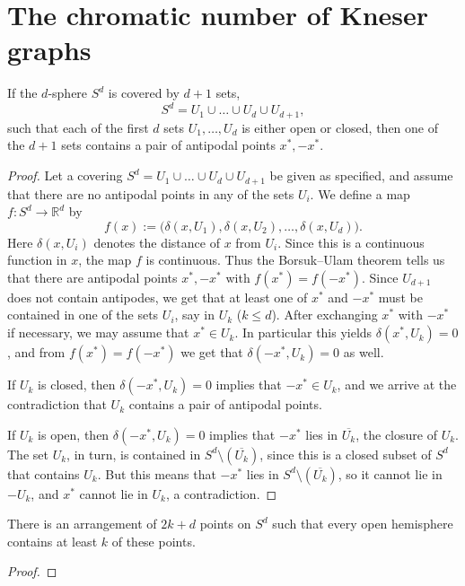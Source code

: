 \chapter{The chromatic number of Kneser graphs}

\begin{theorem}
  \label{lyusternik_shnirelman}
  If the $d$-sphere $S^d$ is covered by $d + 1$ sets,
\[
S^d = U_1 \cup \dots \cup U_d \cup U_{d+1},
\]
such that each of the first $d$ sets $U_1, \dots, U_d$ is either open or closed, then one of the $d + 1$ sets contains a pair of antipodal points $x^*, -x^*$.
\end{theorem}
\begin{proof}
Let a covering $S^d = U_1 \cup \dots \cup U_d \cup U_{d+1}$ be given as specified, and assume that there are no antipodal points in any of the sets $U_i$. We define a map $f : S^d \to \mathbb{R}^d$ by
\[
f(x) := \big(\delta(x, U_1), \delta(x, U_2), \dots, \delta(x, U_d)\big).
\]
Here $\delta(x, U_i)$ denotes the distance of $x$ from $U_i$. Since this is a continuous
 function in $x$, the map $f$ is continuous. Thus the Borsuk–Ulam theorem tells us that there are
  antipodal points $x^*, -x^*$ with $f(x^*) = f(-x^*)$. Since $U_{d+1}$ does not contain antipodes,
  we get that at least one of $x^*$ and $-x^*$ must be
contained in one of the sets $U_i$, say in $U_k$ ($k \leq d$).
 After exchanging $x^*$ with $-x^*$ if necessary, we may assume that $x^* \in U_k$.
 In particular this yields $\delta(x^*, U_k) = 0$, and from $f(x^*) = f(-x^*)$ we get
 that $\delta(-x^*, U_k) = 0$ as well.

If $U_k$ is closed, then $\delta(-x^*, U_k) = 0$ implies that $-x^* \in U_k$, and we arrive at the
 contradiction that $U_k$ contains a pair of antipodal points.

If $U_k$ is open, then $\delta(-x^*, U_k) = 0$ implies that $-x^*$ lies in $\overline{U_k}$,
the closure of $U_k$. The set $U_k$, in turn, is contained in $S^d \setminus (\overline{U_k})$,
since this is a closed subset of $S^d$ that contains $U_k$. But this means that $-x^*$ lies
in $S^d \setminus (\overline{U_k})$, so it cannot lie in $-U_k$, and $x^*$ cannot lie in $U_k$,
a contradiction.
\end{proof}


\begin{theorem}
  \label{gale_theorem}
  There is an arrangement of $2k + d$ points on $S^d$ such that every open hemisphere contains
  at least $k$ of these points.
\end{theorem}
\begin{proof}

\end{proof}

